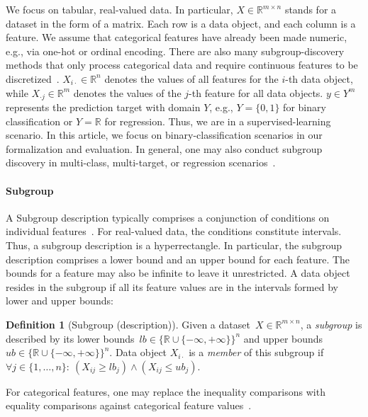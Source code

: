 \documentclass{article}
\theoremstyle{definition}
\newtheorem{definition}{Definition}
\begin{document}
We focus on tabular, real-valued data.
In particular, $X \in \mathbb{R}^{m \times n}$ stands for a dataset in the form of a matrix.
Each row is a data object, and each column is a feature.
We assume that categorical features have already been made numeric, e.g., via one-hot or ordinal encoding.
There are also many subgroup-discovery methods that only process categorical data and require continuous features to be discretized~\cite{herrera2011overview, meeng2021real}.
$X_{i \cdot} \in \mathbb{R}^n$ denotes the values of all features for the $i$-th data object,
while $X_{\cdot j} \in \mathbb{R}^m$ denotes the values of the $j$-th feature for all data objects.
$y \in Y^m$ represents the prediction target with domain $Y$, e.g., $Y=\{0,1\}$ for binary classification or $Y=\mathbb{R}$ for regression.
Thus, we are in a supervised-learning scenario.
In this article, we focus on binary-classification scenarios in our formalization and evaluation.
In general, one may also conduct subgroup discovery in multi-class, multi-target, or regression scenarios~\cite{atzmueller2015subgroup}.

\paragraph{Subgroup}

A Subgroup description typically comprises a conjunction of conditions on individual features~\cite{meeng2021real}.
For real-valued data, the conditions constitute intervals.
Thus, a subgroup description is a hyperrectangle.
In particular, the subgroup description comprises a lower bound and an upper bound for each feature.
The bounds for a feature may also be infinite to leave it unrestricted.
A data object resides in the subgroup if all its feature values are in the intervals formed by lower and upper bounds:
%
\begin{definition}[Subgroup (description)]
	Given a dataset~$X \in \mathbb{R}^{m \times n}$, a \emph{subgroup} is described by its lower bounds~$\mathit{lb} \in \{\mathbb{R} \cup \{-\infty, +\infty\}\}^n$ and upper bounds~$\mathit{ub} \in \{\mathbb{R} \cup \{-\infty, +\infty\}\}^n$.
	Data object $X_{i \cdot}$ is a \emph{member} of this subgroup if $\forall j \in \{1, \dots, n\}:~ \left( X_{ij} \geq \mathit{lb}_j \right) \land \left( X_{ij} \leq \mathit{ub}_j \right)$.
	\label{def:csd:subgroup}
\end{definition}
%
For categorical features, one may replace the inequality comparisons with equality comparisons against categorical feature values~\cite{atzmueller2015subgroup}.
\end{document}
